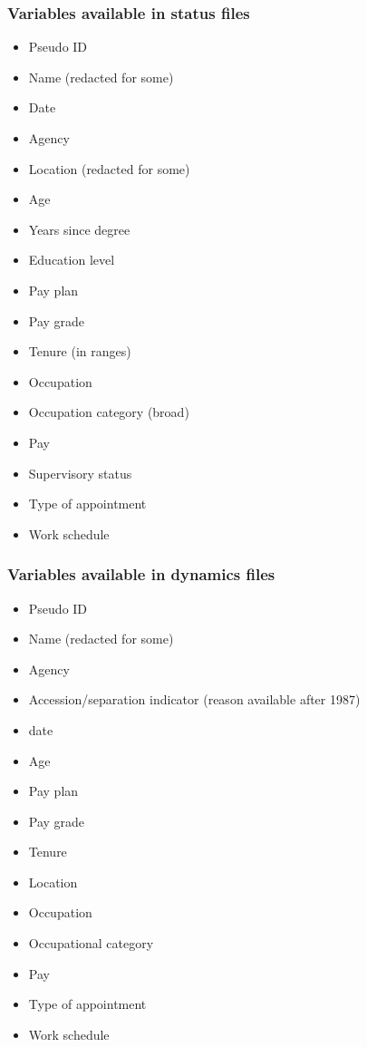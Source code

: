 \documentclass[aspectratio=169]{beamer}
\begin{document}
\begin{frame}
    \frametitle{Variables available in status files}

    \begin{multicols}{2}
        \begin{itemize}
            \item Pseudo ID
            \item Name (redacted for some)
            \item Date
            \item Agency
            \item Location (redacted for some)
            \item Age
            \item Years since degree
            \item Education level
            \item Pay plan
            \item Pay grade
            \item Tenure (in ranges)
            \item Occupation
            \item Occupation category (broad)
            \item Pay
            \item Supervisory status
            \item Type of appointment
            \item Work schedule
        \end{itemize}
    \end{multicols}

\end{frame}

\begin{frame}
    \frametitle{Variables available in dynamics files}

    \begin{multicols}{2}
        \begin{itemize}
            \item Pseudo ID
            \item Name (redacted for some)
            \item Agency
            \item Accession/separation indicator (reason available after 1987)
            \item date
            \item Age
            \item Pay plan
            \item Pay grade
            \item Tenure
            \item Location
            \item Occupation
            \item Occupational category
            \item Pay
            \item Type of appointment
            \item Work schedule
        \end{itemize}
    \end{multicols}

\end{frame}
\end{document}
